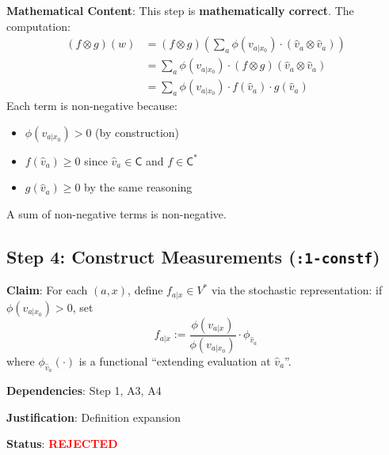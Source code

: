 \documentclass[11pt,a4paper]{article}
\theoremstyle{definition}
\newcommand{\C}{\mathsf{C}}
\newcommand{\Cstar}{\mathsf{C}^*}
\begin{document}
\textbf{Mathematical Content}: This step is \textbf{mathematically correct}. The computation:
\begin{align}
(f \otimes g)(w) &= (f \otimes g)\left(\sum_a \phi(v_{a|x_0}) \cdot (\hat{v}_a \otimes \hat{v}_a)\right) \\
&= \sum_a \phi(v_{a|x_0}) \cdot (f \otimes g)(\hat{v}_a \otimes \hat{v}_a) \\
&= \sum_a \phi(v_{a|x_0}) \cdot f(\hat{v}_a) \cdot g(\hat{v}_a)
\end{align}
Each term is non-negative because:
\begin{itemize}
    \item $\phi(v_{a|x_0}) > 0$ (by construction)
    \item $f(\hat{v}_a) \geq 0$ since $\hat{v}_a \in \C$ and $f \in \Cstar$
    \item $g(\hat{v}_a) \geq 0$ by the same reasoning
\end{itemize}
A sum of non-negative terms is non-negative.

\subsection{Step 4: Construct Measurements (\texttt{:1-constf})}

\begin{rejectedbox}
\textbf{Claim}: For each $(a, x)$, define $f_{a|x} \in V^*$ via the stochastic representation: if $\phi(v_{a|x_0}) > 0$, set
\[
f_{a|x} := \frac{\phi(v_{a|x})}{\phi(v_{a|x_0})} \cdot \phi_{\hat{v}_a}
\]
where $\phi_{\hat{v}_a}(\cdot)$ is a functional ``extending evaluation at $\hat{v}_a$''.

\textbf{Dependencies}: Step 1, A3, A4

\textbf{Justification}: Definition expansion

\textbf{Status}: \textcolor{red}{\textbf{REJECTED}}
\end{rejectedbox}
\end{document}
